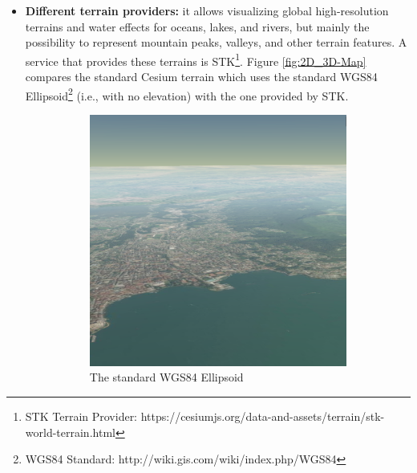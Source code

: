 \begin{itemize}
	\item {\bf Different terrain providers:} it allows visualizing global high-resolution terrains and water effects for oceans, lakes, and rivers, but mainly the possibility to represent mountain peaks, valleys, and other terrain features. A service that provides these terrains is STK\footnote{STK Terrain Provider: https://cesiumjs.org/data-and-assets/terrain/stk-world-terrain.html}. Figure \ref{fig:2D_3D-Map} compares the standard Cesium terrain which uses the standard WGS84 Ellipsoid\footnote{WGS84 Standard: http://wiki.gis.com/wiki/index.php/WGS84} (i.e., with no elevation) with the one provided by STK.
	\begin{figure} [H]
		\centering
		\begin{subfigure}[b]{0.3\textwidth}
			\includegraphics[width=1\textwidth]{chapter2/images/2D-Map}
			\caption{The standard WGS84 Ellipsoid}
			\label{fig:2D-Map}
		\end{subfigure}
		 \qquad
		\begin{subfigure}[b]{0.3\textwidth}

\end{subfigure}
\end{figure}
\end{itemize}
